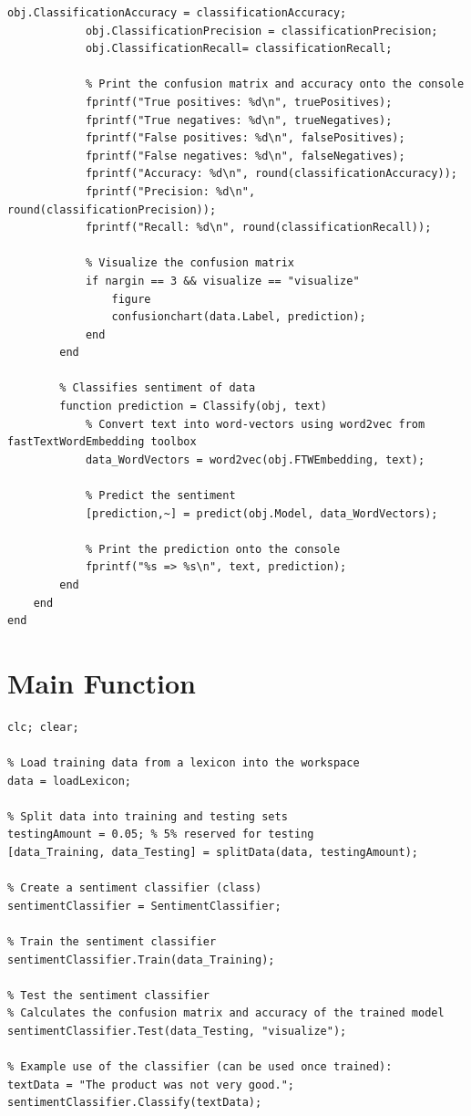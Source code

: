\documentclass[12pt,journal,compsoc]{IEEEtran}
\begin{document}
\begin{lstlisting}[basicstyle=\small, breaklines=true, postbreak=\mbox{\textcolor{red}{$\hookrightarrow$}\space}]
            obj.ClassificationAccuracy = classificationAccuracy;
            obj.ClassificationPrecision = classificationPrecision;
            obj.ClassificationRecall= classificationRecall;

            % Print the confusion matrix and accuracy onto the console
            fprintf("True positives: %d\n", truePositives);
            fprintf("True negatives: %d\n", trueNegatives);
            fprintf("False positives: %d\n", falsePositives);
            fprintf("False negatives: %d\n", falseNegatives);
            fprintf("Accuracy: %d\n", round(classificationAccuracy));
            fprintf("Precision: %d\n", round(classificationPrecision));
            fprintf("Recall: %d\n", round(classificationRecall));

            % Visualize the confusion matrix
            if nargin == 3 && visualize == "visualize"
                figure
                confusionchart(data.Label, prediction);
            end
        end

        % Classifies sentiment of data
        function prediction = Classify(obj, text)
            % Convert text into word-vectors using word2vec from fastTextWordEmbedding toolbox
            data_WordVectors = word2vec(obj.FTWEmbedding, text);

            % Predict the sentiment
            [prediction,~] = predict(obj.Model, data_WordVectors);

            % Print the prediction onto the console
            fprintf("%s => %s\n", text, prediction);
        end
    end
end
\end{lstlisting}

\section{Main Function}
\begin{lstlisting}[basicstyle=\small, breaklines=true, postbreak=\mbox{\textcolor{red}{$\hookrightarrow$}\space}]
% Clear workspace and console
clc; clear;

% Load training data from a lexicon into the workspace
data = loadLexicon;

% Split data into training and testing sets
testingAmount = 0.05; % 5% reserved for testing
[data_Training, data_Testing] = splitData(data, testingAmount);

% Create a sentiment classifier (class)
sentimentClassifier = SentimentClassifier;

% Train the sentiment classifier
sentimentClassifier.Train(data_Training);

% Test the sentiment classifier
% Calculates the confusion matrix and accuracy of the trained model
sentimentClassifier.Test(data_Testing, "visualize");

% Example use of the classifier (can be used once trained):
textData = "The product was not very good.";
sentimentClassifier.Classify(textData);
\end{lstlisting}
\end{document}
